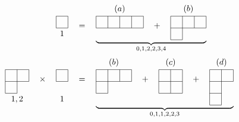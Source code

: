 {\begin{equation*}
\begin{split}
\begin{tikzpicture}[baseline,scale=0.5]
\draw (0,0)--(0,1);
\draw (0,1)--(1,1);
\draw (1,0)--(1,1);
\draw (0,0)--(1,0);
\node[below] at (0.5,0) {$ 1 $};
\end{tikzpicture}\quad&=\quad\underbrace{\begin{tikzpicture}[baseline,scale=0.5]
	\draw (0,0)--(4,0);
	\draw (0,1)--(4,1);
	\draw (0,0)--(0,1);
	\draw (1,0)--(1,1);
	\draw (2,0)--(2,1);
	\draw (3,0)--(3,1);
	\draw (4,0)--(4,1);
	\node[above] at (2,1) {$ (a) $};
	\end{tikzpicture}\quad+\quad\begin{tikzpicture}[baseline,scale=0.5]
	\draw (0,0)--(3,0);
	\draw (0,1)--(3,1);
	\draw (0,-1)--(1,-1);
	\draw (0,-1)--(0,1);
	\draw (1,-1)--(1,1);
	\draw (2,0)--(2,1);
	\draw (3,0)--(3,1);
	\node[above] at (1.5,1) {$ (b) $};
	\end{tikzpicture}}_{0,1,2,2,3,4}\\
\begin{tikzpicture}[baseline,scale=0.5]
\draw (0,0)--(2,0);
\draw (0,1)--(2,1);
\draw (0,-1)--(1,-1);
\draw (0,-1)--(0,1);
\draw (1,-1)--(1,1);
\draw (2,0)--(2,1);
\node[below] at (1,-1) {$ 1,2 $}; 
\end{tikzpicture}\quad\times\quad\begin{tikzpicture}[baseline,scale=0.5]
\draw (0,0)--(1,0);
\draw (1,0)--(1,1);
\draw (0,1)--(1,1);
\draw (0,0)--(0,1);
\node[below] at (0.5,-1) {$ 1 $};
\end{tikzpicture}\quad&=\quad\underbrace{\begin{tikzpicture}[baseline,scale=0.5]
	\draw (0,0)--(3,0);
	\draw (0,1)--(3,1);
	\draw (0,-1)--(1,-1);
	\draw (0,-1)--(0,1);
	\draw (1,-1)--(1,1);
	\draw (2,0)--(2,1);
	\draw (3,0)--(3,1);
	\node[above] at (1.5,1) {$ (b) $};
	\end{tikzpicture}\quad+\quad\begin{tikzpicture}[baseline,scale=0.5]
	\draw (0,0)--(2,0);
	\draw (0,1)--(2,1);
	\draw (0,-1)--(2,-1);
	\draw (0,-1)--(0,1);
	\draw (1,-1)--(1,1);
	\draw (2,-1)--(2,1);
	\node[above] at (1,1) {$ (c) $};
	\end{tikzpicture}\quad+\quad\begin{tikzpicture}[baseline,scale=0.5]
	\draw (0,0)--(2,0);
	\draw (0,1)--(2,1);
	\draw (0,-1)--(1,-1);
	\draw (0,-2)--(1,-2);
	\draw (0,-2)--(0,1);
	\draw (1,-2)--(1,1);
	\draw (2,0)--(2,1);
	\node[above] at (1,1) {$ (d) $};
	\end{tikzpicture}}_{0,1,1,2,2,3}\\
\begin{tikzpicture}[baseline,scale=0.5]

\end{tikzpicture}
\end{split}
\end{equation*}}
